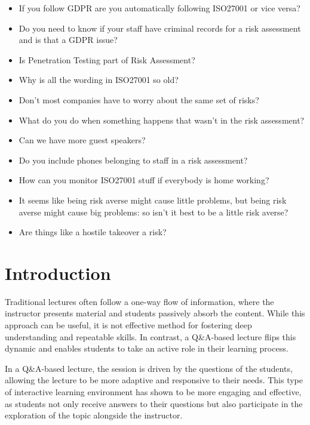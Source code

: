 \documentclass[12pt]{article}
\begin{document}
\begin{itemize}
  \item If you follow GDPR are you automatically following ISO27001 or vice versa?
  \item Do you need to know if your staff have criminal records for a risk assessment and is that a GDPR issue?
  \item Is Penetration Testing part of Risk Assessment?
  \item Why is all the wording in ISO27001 so old?
  \item Don't most companies have to worry about the same set of risks?
  \item What do you do when something happens that wasn't in the risk assessment?
  \item Can we have more guest speakers?
  \item Do you include phones belonging to staff in a risk assessment?
  \item How can you monitor ISO27001 stuff if everybody is home working?
  \item It seems like being risk averse might cause little problems, but being risk averse might cause big problems: so isn't it best to be a little risk averse?
  \item Are things like a hostile takeover a risk?
\end{itemize}







\maketitle

\section*{Introduction}

Traditional lectures often follow a one-way flow of information, where the instructor presents material and students passively absorb the content. 
While this approach can be useful, it is not effective method for fostering deep understanding and repeatable skills. In contrast, a Q\&A-based lecture flips this dynamic and enables students to take an active role in their learning process.\cite{reidsema2017flipped} 

In a Q\&A-based lecture, the session is driven by the questions of the students, allowing the lecture to be more adaptive and responsive to their needs. This type of interactive learning environment has shown to be more engaging and effective, as students not only receive answers to their questions but also participate in the exploration of the topic alongside the instructor.\cite{ZhengLanqin2020TEot} 
\end{document}
